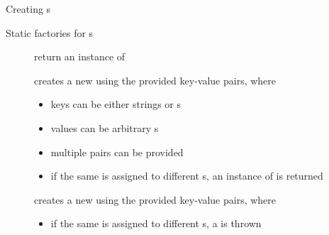 \documentclass[handout]{beamer}
\begin{document}
\begin{frame}{Creating s}
    \begin{block}{Static factories for s}
        \begin{description}
            \item[] return an instance of 
            \item[] creates a new  using the provided key-value pairs, where
            \begin{itemize}\small
                \item keys can be either strings or s
                \item values can be arbitrary s
                \item multiple pairs can be provided
                \item if the same  is assigned to different s, an instance of  is returned
            \end{itemize}

            \item[] creates a new  using the provided key-value pairs, where
            \begin{itemize}\small
                \item if the same  is assigned to different s, a \alert{} is thrown
            \end{itemize}
        \end{description}
    \end{block}
\end{frame}
\end{document}
